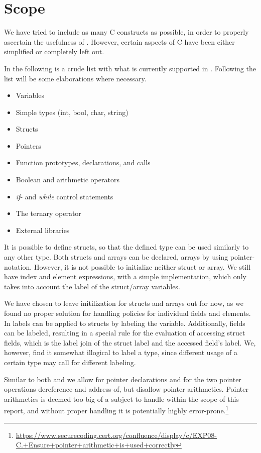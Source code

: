 
\section{Scope}\label{ctif:scope}
We have tried to include as many C constructs as possible, in order to properly ascertain the usefulness of \thelang.
However, certain aspects of C have been either simplified or completely left out.

In the following is a crude list with what is currently supported in \thelang.
Following the list will be some elaborations where necessary.
\begin{itemize}
  \item Variables
  \item Simple types (int, bool, char, string)
  \item Structs
  \item Pointers
  \item Function prototypes, declarations, and calls
  \item Boolean and arithmetic operators
  \item \emph{if}- and \emph{while} control statements
  \item The ternary operator
  \item External libraries
\end{itemize}

It is possible to define structs, so that the defined type can be used similarly to any other type.
Both structs and arrays can be declared, arrays by using pointer-notation.
However, it is not possible to initialize neither struct or array.
We still have index and element expressions, with a simple implementation, which only takes into account the label of the struct/array variables.

We have chosen to leave initilization for structs and arrays out for now, as we found no proper solution for handling policies for individual fields and elements.
In \cite{myers1997} labels can be applied to structs by labeling the variable.
Additionally, fields can be labeled, resulting in a special rule for the evaluation of accessing struct fields, which is the label join of the struct label and the accessed field's label.
We, however, find it somewhat illogical to label a type, since different usage of a certain type may call for different labeling.

Similar to both \cite{muller2015cif} and \cite{maciazek2016cbif} we allow for pointer declarations and for the two pointer operations dereference and address-of, but disallow pointer arithmetics.
Pointer arithmetics is deemed too big of a subject to handle within the scope of this report, and without proper handling it is potentially highly error-prone.\footnote{\url{https://www.securecoding.cert.org/confluence/display/c/EXP08-C.+Ensure+pointer+arithmetic+is+used+correctly}}

